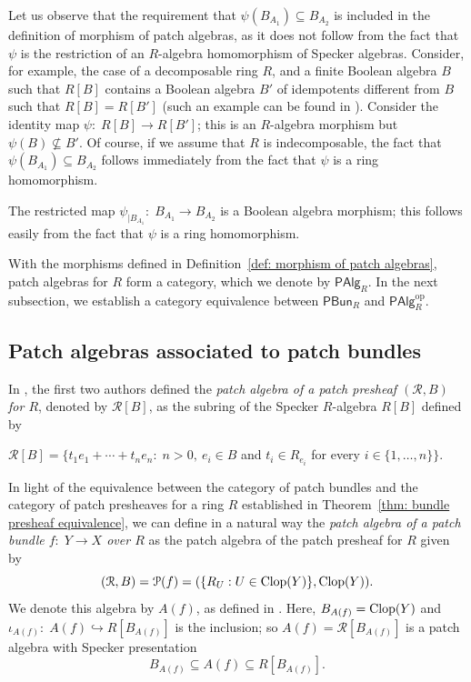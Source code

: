 \documentclass[11pt]{amsart}
\begin{document}
\begin{remark}
Let us observe that the requirement that $\psi(B_{A_1}) \subseteq B_{A_2}$ is included in the definition of morphism of patch algebras, as it does not follow from the fact that $\psi$ is the restriction of an $R$-algebra homomorphism of Specker algebras. Consider, for example, the case of a decomposable ring $R$, and a finite Boolean algebra $B$ such that $R[B]$ contains a Boolean algebra $B'$ of idempotents different from $B$ such that $R[B]=R[B']$ (such an
example can be found in \cite[Example~3.4]{BMMO}). Consider the identity map $\psi \colon\; R[B] \to R[B'] $; this is an $R$-algebra morphism but
$\psi(B) \nsubseteq B'$. Of course, if we assume that $R$ is indecomposable, the fact that $\psi( B_{A_1}) \subseteq B_{A_2}$ follows immediately from the fact that $\psi$ is a ring homomorphism.
\end{remark}

\begin{remark}
    The restricted map $\psi_{|B_{A_1}} \colon\; B_{A_1} \to B_{A_2}$ is a Boolean algebra morphism; this follows easily from the fact that $\psi$ is a ring homomorphism.
\end{remark}

With the morphisms defined in Definition~\ref{def: morphism of patch algebras}, patch algebras for $R$ form a category, which we denote by $\mathsf{PAlg}_R$. In the next subsection, we establish a category equivalence between $\mathsf{PBun}_R$ and $\mathsf{PAlg}_R^{\mathrm{op}}$.

\subsection[Patch algebras associated to patch bundles]{Patch algebras associated to patch bundles}\label{subsec: patch algebras of bundles}
In \cite[Section 6]{CosOlb}, the first two authors defined the {\it patch algebra of a patch presheaf $({{\mathcal R}}, B)$ for $R$}, denoted by
${{\mathcal R}}[B]$, as the subring of the Specker $R$-algebra $R[B]$ defined by 
\smallskip
\begin{center}
${{\mathcal R}}[B] = \{t_1{e_1} + \cdots + t_n {e_n} : \; n>0,\ e_i \in B$ and $t_i \in R_{e_i}$ for every $i\in \{1,\ldots, n\}\}$.
\end{center}


In light of the equivalence between the category of patch bundles and the category of patch presheaves for a ring $R$ established in Theorem~\ref{thm: bundle presheaf equivalence}, we can define in a natural way the {\it patch algebra of a patch bundle $f\colon\; Y \rightarrow X$ over $R$} as the patch algebra of the patch presheaf for $R$ given by
   $$({{\mathcal R}}, B)={\mathcal P}(f)=(\{R_U : U\in {\rm Clop}(Y)\}, {\rm Clop}(Y)).$$
 We denote this algebra by $A(f)$, as defined in \cite[Definition 6.7]{CosOlb}. Here, $B_{A(f)} = {\rm Clop}(Y)$ and $\iota_{A(f)}\colon\; A(f)\hookrightarrow R[B_{A(f)}]$ is the inclusion; so $A(f)={\mathcal R}[B_{A(f)}]$ is a patch algebra with Specker presentation $$B_{A(f)} \subseteq A(f)  \subseteq R[B_{A(f)}].$$ 
\end{document}
